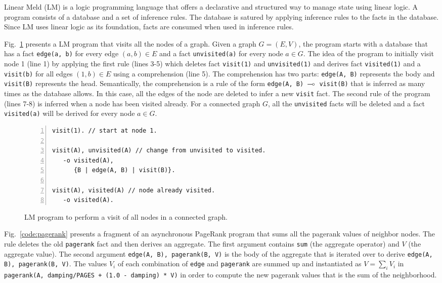 Linear Meld (LM) is a logic programming language that offers a declarative and
structured way to manage state using linear logic. A program consists of a
database and a set of inference rules. The database is satured by applying
inference rules to the facts in the database. Since LM uses linear logic as its
foundation, facts are consumed when used in inference rules.

Fig.~\ref{code:visit} presents a LM program that visits all the nodes of a
graph. Given a graph $G = (E, V)$, the program starts with a database that has a
fact \texttt{edge(a, b)} for every edge $(a, b) \in E$ and a fact
\texttt{unvisited(a)} for every node $a \in G$. The idea of the program to
initially visit node 1 (line 1) by applying the first rule (lines 3-5) which
deletes fact \texttt{visit(1)} and \texttt{unvisited(1)} and derives fact
\texttt{visited(1)} and a \texttt{visit(b)} for all edges $(1, b) \in E$ using a
comprehension (line 5). The comprehension has two parts: \texttt{edge(A, B)}
represents the body and \texttt{visit(B)} represents the head. Semantically, the
comprehension is a rule of the form \texttt{edge(A, B) $\multimap$ visit(B)} that
is inferred as many times as the database allows. In this case, all the edges of
the node are deleted to infer a new \texttt{visit} fact.  The second rule of the
program (lines 7-8) is inferred when a node has been visited already.  For a
connected graph $G$, all the \texttt{unvisited} facts will be deleted and a fact
\texttt{visited(a)} will be derived for every node $a \in G$.


\begin{figure}[h]
\stuffsize\begin{Verbatim}[numbers=left]
visit(1). // start at node 1.

visit(A), unvisited(A) // change from unvisited to visited.
   -o visited(A),
      {B | edge(A, B) | visit(B)}.
 
visit(A), visited(A) // node already visited.
   -o visited(A).
\end{Verbatim}
\caption{LM program to perform a visit of all nodes in a connected graph.}
  \label{code:visit}
\end{figure}

Fig.~\ref{code:pagerank} presents a fragment of an asynchronous PageRank
program that sums all the pagerank values of neighbor nodes. The rule deletes
the old \texttt{pagerank} fact and then derives an aggregate. The first
argument contains \texttt{sum} (the aggregate operator) and $V$ (the
aggregate value). The second argument \texttt{edge(A, B), pagerank(B, V)}
is the body of the aggregate that is iterated over to derive \texttt{edge(A, B),
pagerank(B, V)}. The values $V_i$ of each combination of \texttt{edge}
and \texttt{pagerank} are summed up and instantiated as $V = \sum_i V_i$ in
\texttt{pagerank(A, damping/PAGES + (1.0 - damping) * V)} in order to compute
the new pagerank values that is the sum of the neighborhood.

